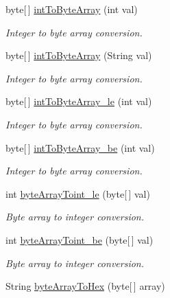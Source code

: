 \begin{DoxyCompactItemize}
\item 
byte\mbox{[}$\,$\mbox{]} \hyperlink{classcom_1_1mobii_1_1utils_1_1_byte_arrays_a3f648867687217211154f2353132ed74}{int\-To\-Byte\-Array} (int val)
\begin{DoxyCompactList}\small\item\em Integer to byte array conversion. \end{DoxyCompactList}\item 
byte\mbox{[}$\,$\mbox{]} \hyperlink{classcom_1_1mobii_1_1utils_1_1_byte_arrays_a6445bf68a5ba18ed908f966fe29fbe4f}{int\-To\-Byte\-Array} (String val)
\begin{DoxyCompactList}\small\item\em Integer to byte array conversion. \end{DoxyCompactList}\item 
byte\mbox{[}$\,$\mbox{]} \hyperlink{classcom_1_1mobii_1_1utils_1_1_byte_arrays_a8f3db965b74c0f63ff31264bd07786c4}{int\-To\-Byte\-Array\-\_\-le} (int val)
\begin{DoxyCompactList}\small\item\em Integer to byte array conversion. \end{DoxyCompactList}\item 
byte\mbox{[}$\,$\mbox{]} \hyperlink{classcom_1_1mobii_1_1utils_1_1_byte_arrays_a22c1e55cf2397b11891fc99f438560ec}{int\-To\-Byte\-Array\-\_\-be} (int val)
\begin{DoxyCompactList}\small\item\em Integer to byte array conversion. \end{DoxyCompactList}\item 
int \hyperlink{classcom_1_1mobii_1_1utils_1_1_byte_arrays_abc6b330d8eb177db426695ba8dfa33f7}{byte\-Array\-Toint\-\_\-le} (byte\mbox{[}$\,$\mbox{]} val)
\begin{DoxyCompactList}\small\item\em Byte array to integer conversion. \end{DoxyCompactList}\item 
int \hyperlink{classcom_1_1mobii_1_1utils_1_1_byte_arrays_af9999352eba22f34fca231de097fd590}{byte\-Array\-Toint\-\_\-be} (byte\mbox{[}$\,$\mbox{]} val)
\begin{DoxyCompactList}\small\item\em Byte array to integer conversion. \end{DoxyCompactList}\item 
String \hyperlink{classcom_1_1mobii_1_1utils_1_1_byte_arrays_ae7541954c780d110f56adf70ea8e07ec}{byte\-Array\-To\-Hex} (byte\mbox{[}$\,$\mbox{]} array)

\end{DoxyCompactItemize}
